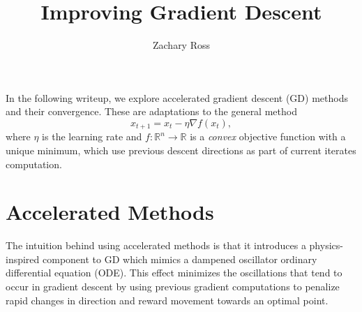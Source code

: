 \documentclass{article}
\title{Improving Gradient Descent}
\author{Zachary Ross}
\newcommand{\R}{\mathbb R}
\theoremstyle{definition}
\begin{document}
\maketitle

In the following writeup, we explore accelerated gradient descent (GD) methods
and their convergence. These are adaptations to the general method
\begin{equation}
    \label{eq:gd}
    x_{t + 1} = x_t - \eta \nabla f(x_t),
\end{equation} where $\eta$ is the learning rate and $f: \R^n \rightarrow \R$ is
a \emph{convex} objective function with a unique minimum, which use previous
descent directions as part of current iterates computation. 


\tableofcontents

\pagebreak

\section{Accelerated Methods}

The intuition behind using accelerated methods is that it introduces a
physics-inspired component to GD which mimics a dampened oscillator ordinary
differential equation (ODE). This effect minimizes the oscillations that tend to
occur in gradient descent by using previous gradient computations to penalize
rapid changes in direction and reward movement towards an optimal point.
\end{document}
